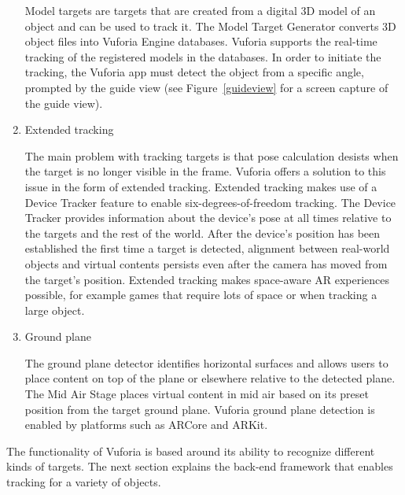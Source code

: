 \begin{enumerate}
Model targets are targets that are created from a digital 3D model of an object and can be used to track it. The Model Target Generator converts 3D object files into Vuforia Engine databases. Vuforia supports the real-time tracking of the registered models in the databases. In order to initiate the tracking, the Vuforia app must detect the object from a specific angle, prompted by the guide view (see Figure~\ref{guideview} for a screen capture of the guide view).

\begin{figure}[!ht]
\end{figure}

\item Extended tracking

The main problem with tracking targets is that pose calculation desists when the target is no longer visible in the frame. Vuforia offers a solution to this issue in the form of extended tracking. Extended tracking makes use of a Device Tracker feature to enable six-degrees-of-freedom tracking. The Device Tracker provides information about the device's pose at all times relative to the targets and the rest of the world. After the device's position has been established the first time a target is detected, alignment between real-world objects and virtual contents persists even after the camera has moved from the target's position. Extended tracking makes space-aware AR experiences possible, for example games that require lots of space or when tracking a large object.

\item Ground plane

The ground plane detector identifies horizontal surfaces and allows users to place content on top of the plane or elsewhere relative to the detected plane. The Mid Air Stage places virtual content in mid air based on its preset position from the target ground plane. Vuforia ground plane detection is enabled by platforms such as ARCore and ARKit.

\end{enumerate}

The functionality of Vuforia is based around its ability to recognize different kinds of targets. The next section explains the back-end framework that enables tracking for a variety of objects.

